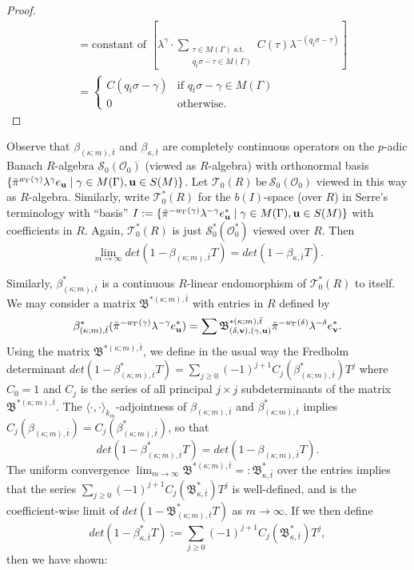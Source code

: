 \documentclass{article}
\theoremstyle{remark}
\def\c #1{ {\mathcal #1} }
\def\f #1{ {\mathfrak #1} }
\def\b #1{ {\bf #1} }
\begin{document}
\begin{proof}
\begin{align*}
&= \text{constant of } \left[ \lambda^\gamma \cdot  \sum_{\substack{\tau \in M(\Gamma) \text{ s.t.} \\ q_{\bar t} \sigma - \tau \in M(\Gamma)}} C(\tau) \lambda^{-(q_{\bar t} \sigma - \tau)} \right] \\
&= 
\begin{cases}
C(q_{\bar t} \sigma - \gamma) & \text{if } q_{\bar t} \sigma - \gamma \in M(\Gamma) \\
0 & \text{otherwise.}
\end{cases}
\end{align*}
\end{proof}


Observe that $\beta_{(\kappa; m), \bar t}$ and $\beta_{\kappa, \bar t}$ are completely continuous operators on the $p$-adic Banach $R$-algebra $\c S_0(\c O_0)$ (viewed as $R$-algebra) with orthonormal basis $\{ \tilde \pi^{w_\Gamma(\gamma)} \lambda^\gamma e_{\b u} \mid \gamma \in M(\Gamma), \b u \in S(M) \}$. Let $\c T_0(R) \ \text{be} \ \c S_0(\c O_0)$ viewed in this way as $R$-algebra. Similarly, write $\c T_0^*(R)$ for the $b(I)$-space (over $R$) in Serre's terminology with ``basis'' $I := \{ \tilde \pi^{-w_\Gamma(\gamma)} \lambda^{-\gamma} e_{\b u}^* \mid \gamma \in M(\Gamma), \b u \in S(M) \}$ with coefficients in $R$. Again, $\c T_0^*(R)$ is just $\c S_0^*(\c O_0^*)$ viewed over $R$. Then
\[
\lim_{m \rightarrow \infty} det(1 - \beta_{(\kappa; m), \bar t} T) = det(1 - \beta_{\kappa, \bar t} T).
\]

Similarly, $\beta^*_{(\kappa; m), \bar t}$ is a continuous $R$-linear endomorphism of $\c T_0^*(R)$ to itself. We may consider a matrix $\f B^{*(\kappa; m), \bar t}$ with entries in $R$ defined by
\[
\beta^*_{(\kappa; m), \bar t}( \tilde \pi^{-w_{\Gamma}(\gamma)} \lambda^{-\gamma} e_{\b u}^*) = \sum \f B^{*(\kappa; m), \bar t}_{(\delta, \b v), (\gamma, \b u)} \tilde \pi^{-w_\Gamma(\delta)} \lambda^{-\delta} e_{\b v}^*.
\]
Using the matrix $\f B^{*(\kappa; m), \bar t}$, we define in the usual way the Fredholm determinant $det(1 - \beta_{(\kappa; m), \bar t}^* T) = \sum_{j \geq 0} (-1)^{j+1} C_j(\beta_{(\kappa; m), \bar t}^*) T^j$ where $C_0  = 1$ and $C_j$ is the series of all principal $j \times j$ subdeterminants of the matrix $\f B^{*(\kappa; m), \bar t}$. The $\langle \cdot, \cdot \rangle_{k_m}$-adjointness of $\beta_{(\kappa; m), \bar t}$ and $\beta^*_{(\kappa; m), \bar t}$ implies $C_j(\beta_{(\kappa; m), \bar t}) = C_j(\beta_{(\kappa; m), \bar t}^*)$, so that
\[
det(1 - \beta_{(\kappa; m), \bar t}^* T) = det(1 - \beta_{(\kappa; m), \bar t} T).
\]
The uniform convergence $\lim_{m \rightarrow \infty} \f B^{*(\kappa; m), \bar t}  =: \f B^*_{\kappa, \bar t}$  over the entries implies that the series $\sum_{j \geq 0} (-1)^{j+1} C_j(\f B_{\kappa, \bar t}^*) T^j$ is well-defined, and is the coefficient-wise limit  of $det(1 - \f B^*_{(\kappa; m), \bar t} T)$ as $m \rightarrow \infty$. If we then define
\[
det(1 - \beta^*_{\kappa, \bar t} T) := \sum_{j \geq 0} (-1)^{j+1} C_j(\f B_{\kappa, \bar t}^*) T^j,
\]
then we have shown:
\end{document}
